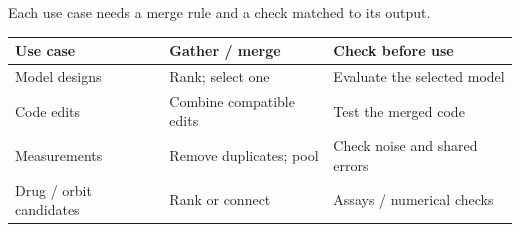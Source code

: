 \begin{frame}[t]{Each use case needs a merge rule and a check matched to its output.\ev{\tagP}}
\vspace{.1cm}
{\fontsize{11.5}{14}\selectfont\begin{tabularx}{\linewidth}{@{}L{3.3cm}L{3.4cm}Y@{}}
\toprule\textbf{Use case} & \textbf{Gather / merge} & \textbf{Check before use}\\\midrule
Model designs & Rank; select one & Evaluate the selected model\\[4pt]
Code edits & Combine compatible edits & Test the merged code\\[4pt]
Measurements & Remove duplicates; pool & Check noise and shared errors\\[4pt]
Drug / orbit candidates & Rank or connect & Assays / numerical checks\\\bottomrule
\end{tabularx}\par}
\vspace{.2cm}


\end{frame}
